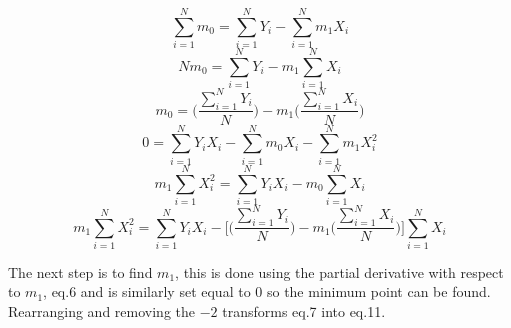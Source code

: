 \documentclass[11pt]{article}
\begin{document}
\begin{figure}[h]
\begin{equation}
\sum\limits_{i=1}^N m_0 = \sum\limits_{i=1}^N Y_i - \sum\limits_{i=1}^N m_1X_i
\end{equation}
\begin{equation}
N m_0 = \sum\limits_{i=1}^N Y_i - m_1\sum\limits_{i=1}^N X_i
\end{equation}
\begin{equation}
m_0 = \Bigg(\frac{\sum\limits_{i=1}^N Y_i}{N}\Bigg) - m_1\Bigg(\frac{\sum\limits_{i=1}^N X_i}{N}\Bigg)
\end{equation}
\endminipage\hfill
{}%
\begin{equation}
0 = \sum\limits_{i=1}^N Y_iX_i - \sum\limits_{i=1}^N m_0X_i - \sum\limits_{i=1}^N m_1X_i^2
\end{equation}
\begin{equation}
m_1\sum\limits_{i=1}^N X_i^2 = \sum\limits_{i=1}^N Y_iX_i - m_0\sum\limits_{i=1}^N X_i 
\end{equation}
\begin{equation}
m_1\sum\limits_{i=1}^N X_i^2 = \sum\limits_{i=1}^N Y_iX_i - \Bigg[\Bigg(\frac{\sum\limits_{i=1}^N Y_i}{N}\Bigg) - m_1\Bigg(\frac{\sum\limits_{i=1}^N X_i}{N}\Bigg)\Bigg] \sum\limits_{i=1}^N X_i 
\end{equation}
\endminipage
\end{figure} 

The next step is to find $m_1$, this is done using the partial derivative with respect to $m_1$, eq.6 and is similarly set equal to 0 so the minimum point can be found. Rearranging and removing the $-2$ transforms eq.7 into eq.11. 
\end{document}
